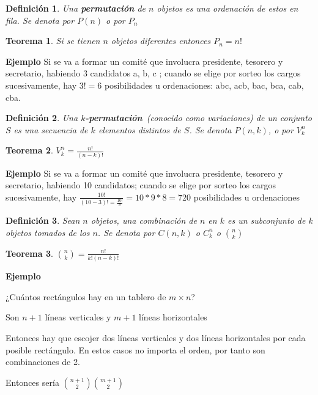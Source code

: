 \documentclass[a4paper,12pt]{report}
\newtheorem*{teo}{Teorema}
\newtheorem*{dfn}{Definición}
\begin{document}
\begin{dfn}
 Una \textbf{permutación} de $n$ objetos es una ordenación de estos en fila. Se denota por $P(n)$ o por $P_n$  
\end{dfn}

\begin{teo}
 Si se tienen $n$ objetos diferentes entonces $P_n = n!$
\end{teo}

\textbf{Ejemplo}
 Si se va a formar un comité que involucra presidente, tesorero y secretario, habiendo 3 candidatos a, b, c ; cuando se elige por sorteo los cargos sucesivamente, hay $3!=6$ posibilidades u ordenaciones: abc, acb, bac, bca, cab, cba.

\begin{dfn}
 Una \textbf{$k$-permutación}~(conocido como variaciones) de un conjunto $S$ es una secuencia de $k$ elementos distintos de $S$. Se denota $P(n,k)$, o por $V^n_k$ 
\end{dfn}

\begin{teo}
 $V^n_k=\frac{n!}{(n-k)!}$
\end{teo}

\textbf{Ejemplo}
 Si se va a formar un comité que involucra presidente, tesorero y secretario, habiendo 10 candidatos; cuando se elige por sorteo los cargos sucesivamente, hay $\frac{10!}{(10-3)!=\frac{10!}{7!}}=10*9*8=720$ posibilidades u ordenaciones




\begin{dfn}
 Sean $n$ objetos, una combinación de $n$ en $k$ es un subconjunto de $k$ objetos tomados de los $n$. Se denota por $C(n,k)$ o $C^n_k$ o ${n}\choose{k}$  
\end{dfn}

\begin{teo}
 ${n}\choose{k}$$=\frac{n!}{k!(n-k)!}$  
\end{teo}


\textbf{Ejemplo}

¿Cuántos rectángulos hay en un tablero de $m\times n$?

Son $n+1$ líneas verticales y $m+1$ líneas horizontales

Entonces hay que escojer dos líneas verticales y dos líneas horizontales por cada posible rectángulo. En estos casos no importa el orden, por tanto son combinaciones de 2.

Entonces sería ${n+1}\choose{2}$${m+1}\choose{2}$
\end{document}
